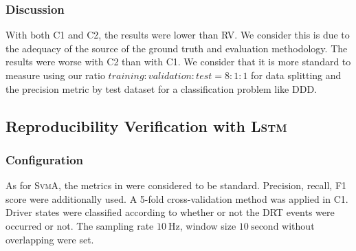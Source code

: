 \documentclass[letterpaper, 10 pt, conference]{ieeeconf}  %
\newcommand{\Impl}[1]{\textsc{#1}}
\begin{document}
\subsubsection{Discussion}

With both C1 and C2, the results were lower than RV.
We consider this is due to the adequacy of the source of the ground truth and evaluation methodology.
The results were worse with C2 than with C1.
We consider that it is more standard to measure using our ratio $training:validation:test=8:1:1$ for data splitting and the precision metric by test dataset for a classification problem like DDD. 

%

\subsection{Reproducibility Verification with \Impl{Lstm}} 

\subsubsection{Configuration}

As for \Impl{SvmA}, the metrics in \cite{Wang2022} were considered to be standard.
Precision, recall, F1 score were additionally used.
%
{A 5-fold cross-validation method was applied in C1.}
Driver states were classified according to whether or not the DRT events were occurred or not.
{The sampling rate $10~\mathrm{Hz}$, window size $10~\mathrm{second}$ without overlapping were set.}
\end{document}
